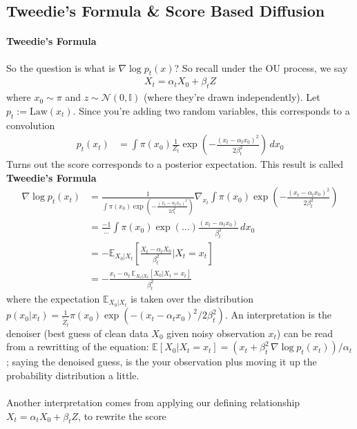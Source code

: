 \subsection{Tweedie's Formula \& Score Based Diffusion}
\paragraph{Tweedie's Formula}
So the question is what is $\nabla \log p_t(x)$? So recall under the OU process, we say
\begin{align}
	X_t = \alpha_t X_0 + \beta_t Z
\end{align} 
where $x_0 \sim \pi$ and $z \sim \mathcal N(0, \mathbb I)$ (where they're drawn independently). Let $p_t := \text{Law}(x_t)$. Since you're adding two random variables, this corresponds to a convolution
\begin{align}
	p_t(x_t) & = \int \pi(x_0) \frac{1}{Z_t} \exp \left( - \frac{(x_t - \alpha_t x_0)^2}{2 \beta_t^2} \right) \, dx_0
\end{align}
Turns out the score corresponds to a posterior expectation. This result is called \textbf{Tweedie's Formula}
\begin{align}
	\nabla \log p_t(x_t) & = \frac{1}{\int \pi(x_0) \exp \left( - \frac{(x_t - \alpha_t x_0)^2}{2 \beta_t^2} \right)} \nabla_{x_t} \int \pi(x_0) \exp \left( - \frac{(x_t - \alpha_t x_0)^2}{2 \beta_t^2} \right)\\
	& = \frac{-1}{...}  \int \pi(x_0) \exp(...) \frac{(x_t - \alpha_t x_0)}{\beta_t^2}\, dx_0\\
	& = - \mathbb E_{X_0 | X_t} \left[ \frac{X_t -\alpha_t X_0}{\beta_t^2}  \Big | X_t = x_t\right] \\
	& = - \frac{x_t - \alpha_t\,  \mathbb E_{X_0 | X_t} [X_0 | X_t = x_t] }{\beta_t^2} 
\end{align}
where the expectation $\mathbb E_{X_0|X_t}$ is taken over the distribution $p(x_0 | x_t) = \frac{1}{\tilde Z_t}   \pi(x_0) \exp \left( - (x_t- \alpha_t x_0)^2/2 \beta_t^2\right)$. An interpretation is the denoiser (best guess of clean data $X_0$ given noisy observation $x_t$) can be read from a rewritting of the equation: $\mathbb E[X_0 | X_t = x_t] = (x_t+ \beta_t^2 \, \nabla \log p_t(x_t))/\alpha_t$; saying the denoised guess, is the your observation plus moving it up the probability distribution a little.
\\
\\
Another interpretation comes from applying our defining relationship $X_t = \alpha_t X_0 + \beta_t Z$, to rewrite the score
